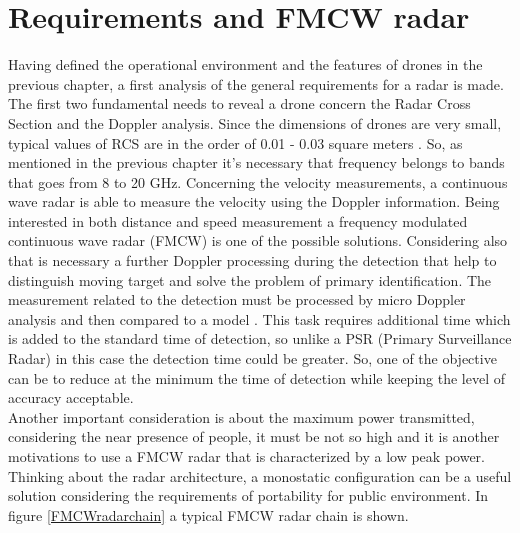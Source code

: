 \section{Requirements and FMCW radar}
Having defined the operational environment and the features of drones in the previous chapter, a first analysis of the general requirements for a radar is made. The first two fundamental needs to reveal a drone concern the Radar Cross Section and the Doppler analysis. Since the dimensions of drones are very small, typical values of RCS are in the order of 0.01 - 0.03 square meters \cite{rcsdrone}. So, as mentioned in the previous chapter it's necessary that frequency belongs to bands that goes from 8 to 20 GHz. Concerning the velocity measurements, a continuous wave radar is able to measure the velocity using the Doppler information. Being interested in both distance and speed measurement a frequency modulated continuous wave radar (FMCW) is one of the possible solutions. Considering also that is necessary a further Doppler processing during the detection that help to distinguish moving target and solve the problem of primary identification. The measurement related to the detection must be processed by micro Doppler analysis and then compared to a model \cite{microdoppler_and_SVM}. This task requires additional time which is added to the standard time of detection, so unlike a PSR (Primary Surveillance Radar) in this case the detection time could be greater. So, one of the objective can be to reduce at the minimum the time of detection while keeping the level of accuracy acceptable.\\ Another important consideration is about the maximum power transmitted, considering the near presence of people, it must be not so high and it is another motivations to use a FMCW radar that is characterized by a low peak power. Thinking about the radar architecture, a monostatic configuration can be a useful solution considering the requirements of portability for public environment. In figure \ref{FMCWradarchain} a typical FMCW radar chain is shown. 

